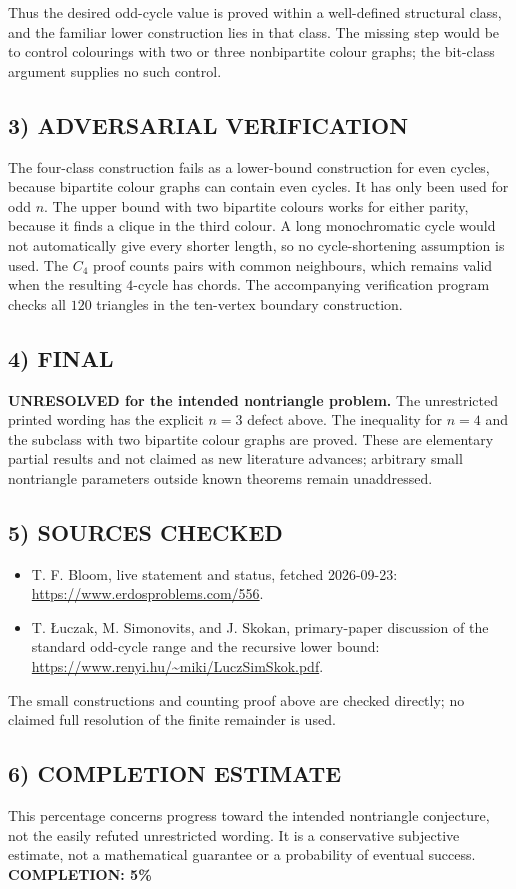 Thus the desired odd-cycle value is proved within a well-defined structural class, and the familiar lower construction lies in that class. The missing step would be to control colourings with two or three nonbipartite colour graphs; the bit-class argument supplies no such control.

\subsection{3) ADVERSARIAL VERIFICATION}
The four-class construction fails as a lower-bound construction for even cycles, because bipartite colour graphs can contain even cycles. It has only been used for odd $n$. The upper bound with two bipartite colours works for either parity, because it finds a clique in the third colour. A long monochromatic cycle would not automatically give every shorter length, so no cycle-shortening assumption is used. The $C_4$ proof counts pairs with common neighbours, which remains valid when the resulting $4$-cycle has chords. The accompanying verification program checks all $120$ triangles in the ten-vertex boundary construction.

\subsection{4) FINAL}
\textbf{UNRESOLVED for the intended nontriangle problem.} The unrestricted printed wording has the explicit $n=3$ defect above. The inequality for $n=4$ and the subclass with two bipartite colour graphs are proved. These are elementary partial results and not claimed as new literature advances; arbitrary small nontriangle parameters outside known theorems remain unaddressed.

\subsection{5) SOURCES CHECKED}
\begin{itemize}
\item T. F. Bloom, live statement and status, fetched 2026-09-23: \url{https://www.erdosproblems.com/556}.
\item T. \L uczak, M. Simonovits, and J. Skokan, primary-paper discussion of the standard odd-cycle range and the recursive lower bound: \url{https://www.renyi.hu/~miki/LuczSimSkok.pdf}.
\end{itemize}
The small constructions and counting proof above are checked directly; no claimed full resolution of the finite remainder is used.

\subsection{6) COMPLETION ESTIMATE}
This percentage concerns progress toward the intended nontriangle conjecture, not the easily refuted unrestricted wording. It is a conservative subjective estimate, not a mathematical guarantee or a probability of eventual success.
\textbf{COMPLETION: 5\%}
